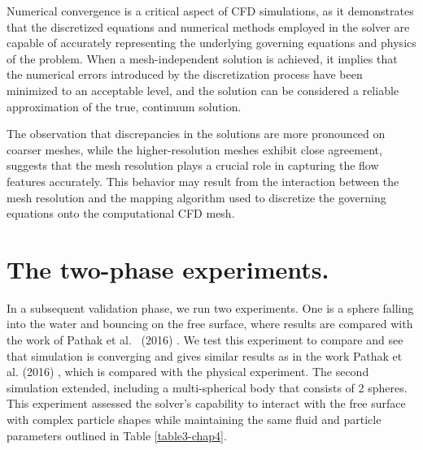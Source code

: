 Numerical convergence is a critical aspect of CFD simulations, as it demonstrates that the discretized equations and numerical methods employed in the solver are capable of accurately representing the underlying governing equations and physics of the problem. When a mesh-independent solution is achieved, it implies that the numerical errors introduced by the discretization process have been minimized to an acceptable level, and the solution can be considered a reliable approximation of the true, continuum solution.

The observation that discrepancies in the solutions are more pronounced on coarser meshes, while the higher-resolution meshes exhibit close agreement, suggests that the mesh resolution plays a crucial role in capturing the flow features accurately. This behavior may result from the interaction between the mesh resolution and the mapping algorithm used to discretize the governing equations onto the computational CFD mesh. 


\section{The two-phase experiments.}

In a subsequent validation phase, we run two experiments. One is a sphere falling into the water and bouncing on the free surface, where results are compared with the work of Pathak et al.~ (2016) \cite{pathak20163d}. We test this experiment to compare and see that simulation is converging and gives similar results as in the work Pathak et al. (2016) \cite{pathak20163d}, which is compared with the physical experiment.
The second simulation extended, including a multi-spherical body that consists of 2 spheres. This experiment assessed the solver's capability to interact with the free surface with complex particle shapes while maintaining the same fluid and particle parameters outlined in Table \ref{table3-chap4}.

